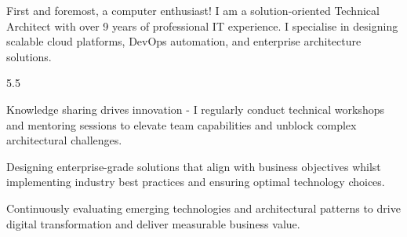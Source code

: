 \documentclass[9pt]{style/developercv}
\begin{document}
\begin{minipage}[t]{0.4\textwidth} %
	\vspace{-\baselineskip} %

  First and foremost, a computer enthusiast! I am a solution-oriented Technical Architect with over 9 years of professional IT experience.
  I specialise in designing scalable cloud platforms, DevOps automation, and enterprise architecture solutions.

\end{minipage}
\hfill %
\begin{minipage}[t]{0.5\textwidth} %
	\vspace{-\baselineskip} %
  \begin{barchart}{5.5}
	\end{barchart}
\end{minipage}

\vspace{1cm}


\begin{minipage}[t]{0.3\textwidth}
    \vspace{-\baselineskip}


  Knowledge sharing drives innovation - I regularly conduct technical workshops and mentoring sessions to elevate team capabilities and unblock complex architectural challenges.

\end{minipage}
\hfill
\begin{minipage}[t]{0.3\textwidth}
    \vspace{-\baselineskip}

    Designing enterprise-grade solutions that align with business objectives whilst implementing industry best practices and ensuring optimal technology choices.

\end{minipage}
\hfill
\begin{minipage}[t]{0.3\textwidth}
    \vspace{-\baselineskip}

  Continuously evaluating emerging technologies and architectural patterns to drive digital transformation and deliver measurable business value.

\end{minipage}
\vspace{0.75cm}
\end{document}
